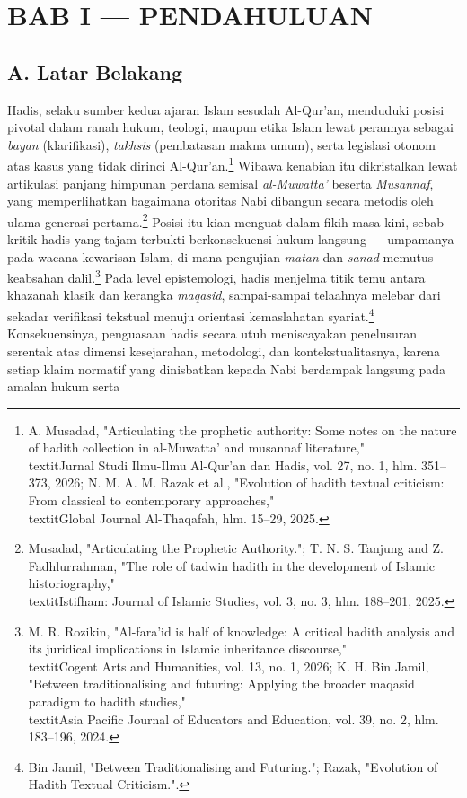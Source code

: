 
\section*{BAB I --- PENDAHULUAN}

\subsection*{A. Latar Belakang}

Hadis, selaku sumber kedua ajaran Islam sesudah Al-Qur'an, menduduki posisi pivotal dalam ranah hukum, teologi, maupun etika Islam lewat perannya sebagai \textit{bayan} (klarifikasi), \textit{takhsis} (pembatasan makna umum), serta legislasi otonom atas kasus yang tidak dirinci Al-Qur'an.\footnote{A. Musadad, "Articulating the prophetic authority: Some notes on the nature of hadith collection in al-Muwatta' and musannaf literature," \\textit{Jurnal Studi Ilmu-Ilmu Al-Qur'an dan Hadis}, vol. 27, no. 1, hlm. 351--373, 2026; N. M. A. M. Razak et al., "Evolution of hadith textual criticism: From classical to contemporary approaches," \\textit{Global Journal Al-Thaqafah}, hlm. 15--29, 2025.} Wibawa kenabian itu dikristalkan lewat artikulasi panjang himpunan perdana semisal \textit{al-Muwatta'} beserta \textit{Musannaf}, yang memperlihatkan bagaimana otoritas Nabi dibangun secara metodis oleh ulama generasi pertama.\footnote{Musadad, "Articulating the Prophetic Authority."; T. N. S. Tanjung and Z. Fadhlurrahman, "The role of tadwin hadith in the development of Islamic historiography," \\textit{Istifham: Journal of Islamic Studies}, vol. 3, no. 3, hlm. 188--201, 2025.} Posisi itu kian menguat dalam fikih masa kini, sebab kritik hadis yang tajam terbukti berkonsekuensi hukum langsung --- umpamanya pada wacana kewarisan Islam, di mana pengujian \textit{matan} dan \textit{sanad} memutus keabsahan dalil.\footnote{M. R. Rozikin, "Al-fara'id is half of knowledge: A critical hadith analysis and its juridical implications in Islamic inheritance discourse," \\textit{Cogent Arts and Humanities}, vol. 13, no. 1, 2026; K. H. Bin Jamil, "Between traditionalising and futuring: Applying the broader maqasid paradigm to hadith studies," \\textit{Asia Pacific Journal of Educators and Education}, vol. 39, no. 2, hlm. 183--196, 2024.} Pada level epistemologi, hadis menjelma titik temu antara khazanah klasik dan kerangka \textit{maqasid}, sampai-sampai telaahnya melebar dari sekadar verifikasi tekstual menuju orientasi kemaslahatan syariat.\footnote{Bin Jamil, "Between Traditionalising and Futuring."; Razak, "Evolution of Hadith Textual Criticism.".} Konsekuensinya, penguasaan hadis secara utuh meniscayakan penelusuran serentak atas dimensi kesejarahan, metodologi, dan kontekstualitasnya, karena setiap klaim normatif yang dinisbatkan kepada Nabi berdampak langsung pada amalan hukum serta 